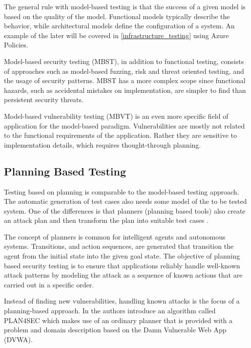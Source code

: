 The general rule with model-based testing is that the success of a given model is based on the quality of the model. \citep{mbsvt2007}
Functional models typically describe the behavior, while architectural models define the configuration of a system. \citep{mbst2012}
An example of the later will be covered in \ref{infrastructure_testing} using Azure Policies.

Model-based security testing (MBST), in addition to functional testing, consists of approaches such as model-based fuzzing, risk and threat oriented testing, and the usage of security patterns. MBST has a more complex scope since functional hazards, such as accidental mistakes on implementation, are simpler to find than persistent security threats. \citep{mbst2012}

Model-based vulnerability testing (MBVT) is an even more specific field of application for the model-based paradigm. \citep{mbsvt2007}
Vulnerabilities are mostly not related to the functional requirements of the application. Rather they are sensitive to implementation details, which requires thought-through planning. \citep{mbvtWA2013}


\subsection{Planning Based Testing}
\label{planningBased}
Testing based on planning is comparable to the model-based testing approach. The automatic generation of test cases also needs some model of the to be tested system. 
One of the differences is that planners (planning based tools) also create an attack plan and then transform the plan into suitable test cases \citep{wotawa2014}.

The concept of planners is common for intelligent agents and autonomous systems. Transitions, and action sequences, are generated that transition the agent from the initial state into the given goal state.
The objective of planning based security testing is to ensure that applications reliably handle well-known attack patterns by modeling the attack as a sequence of known actions that are carried out in a specific order.

Instead of finding new vulnerabilities, handling known attacks is the focus of a planning-based approach.
In \citep{wotawa2014} the authors introduce an algorithm called PLAN4SEC which makes use of an ordinary planner that is provided with a problem and domain description based on the Damn Vulnerable Web App (DVWA).

